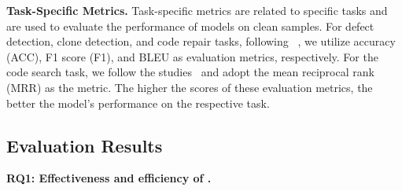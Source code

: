 \noindent\textbf{Task-Specific Metrics.} Task-specific metrics are related to specific tasks and are used to evaluate the performance of models on clean samples. For defect detection, clone detection, and code repair tasks, following ~\cite{2024-Poison-Attack-and-Poison-Detection-on-Deep-Source-Code-Processing-Models}, we utilize accuracy (ACC), F1 score (F1), and BLEU as evaluation metrics, respectively.  
For the code search task, we follow the studies~\cite{2022-you-see-what-I-want-you-to-see, 2023-BADCODE} and adopt the mean reciprocal rank (MRR) as the metric. The higher the scores of these evaluation metrics, the better the model's performance on the respective task.



\subsection{Evaluation Results}
\label{subsec:evaluation_results}

\noindent\textbf{RQ1: Effectiveness and efficiency of \ours{}.}




